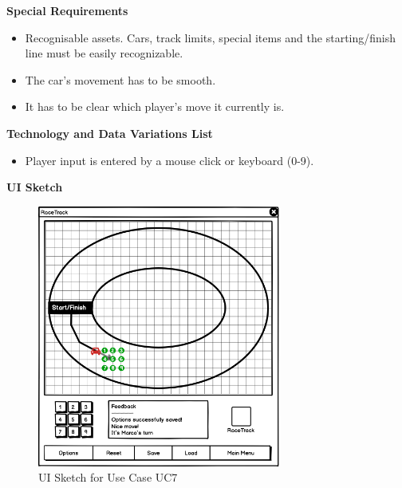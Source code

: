 			\textbf{Special Requirements}
				\begin{itemize}
					\item Recognisable assets. Cars, track limits, special items and the starting/finish line must be easily recognizable.
					\item The car's movement has to be smooth.
					\item It has to be clear which player's move it currently is.
				\end{itemize}

			\textbf{Technology and Data Variations List}
				\begin{itemize}
					\item Player input is entered by a mouse click or keyboard (0-9).
				\end{itemize}

			\textbf{UI Sketch}
				\begin{figure}[H]
					\centering
					\includegraphics[width=8cm,keepaspectratio,center]{img/Use-Case-Model_UC7_UI-Sketch.png}
					\caption{UI Sketch for Use Case UC7}
				\end{figure}

			\newpage

